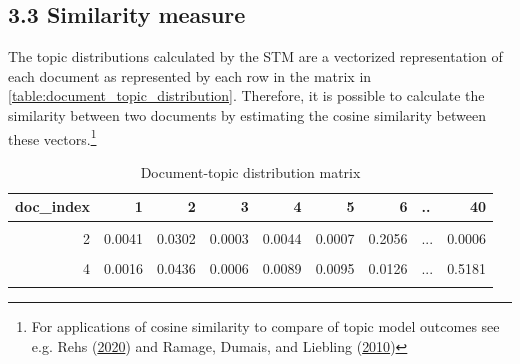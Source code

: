 \documentclass[
  12pt,
]{article}
\begin{document}
\hypertarget{similarity-measure}{%
\subsection{3.3 Similarity measure}\label{similarity-measure}}

The topic distributions calculated by the STM are a vectorized
representation of each document as represented by each row in the matrix
in \autoref{table:document_topic_distribution}. Therefore, it is
possible to calculate the similarity between two documents by estimating
the cosine similarity between these vectors.\footnote{For applications
  of cosine similarity to compare of topic model outcomes see e.g. Rehs
  (\protect\hyperlink{ref-rehs_structural_2020}{2020}) and Ramage,
  Dumais, and Liebling
  (\protect\hyperlink{ref-ramage_characterizing_2010}{2010})}

\begin{table}[H]

\caption{\label{tab:Document-topic distribution matrix - sample values}Document-topic distribution matrix \label{table:document_topic_distribution}}
\centering
\fontsize{7}{9}\selectfont
\begin{tabular}[t]{rrrrrrrlr}
\toprule
doc\_index & 1 & 2 & 3 & 4 & 5 & 6 & .. & 40\\
\midrule
\cellcolor{gray!6}{1} & \cellcolor{gray!6}{0.0016} & \cellcolor{gray!6}{0.0453} & \cellcolor{gray!6}{0.0005} & \cellcolor{gray!6}{0.0078} & \cellcolor{gray!6}{0.0151} & \cellcolor{gray!6}{0.0118} & \cellcolor{gray!6}{...} & \cellcolor{gray!6}{0.4376}\\
2 & 0.0041 & 0.0302 & 0.0003 & 0.0044 & 0.0007 & 0.2056 & ... & 0.0006\\
\cellcolor{gray!6}{3} & \cellcolor{gray!6}{0.0043} & \cellcolor{gray!6}{0.0039} & \cellcolor{gray!6}{0.0012} & \cellcolor{gray!6}{0.0003} & \cellcolor{gray!6}{0.0017} & \cellcolor{gray!6}{0.0266} & \cellcolor{gray!6}{...} & \cellcolor{gray!6}{0.0050}\\
4 & 0.0016 & 0.0436 & 0.0006 & 0.0089 & 0.0095 & 0.0126 & ... & 0.5181\\
\cellcolor{gray!6}{5} & \cellcolor{gray!6}{0.0016} & \cellcolor{gray!6}{0.0515} & \cellcolor{gray!6}{0.0002} & \cellcolor{gray!6}{0.0122} & \cellcolor{gray!6}{0.0050} & \cellcolor{gray!6}{0.0121} & \cellcolor{gray!6}{...} & \cellcolor{gray!6}{0.5750}\\
\bottomrule
\end{tabular}
\end{table}
\end{document}
